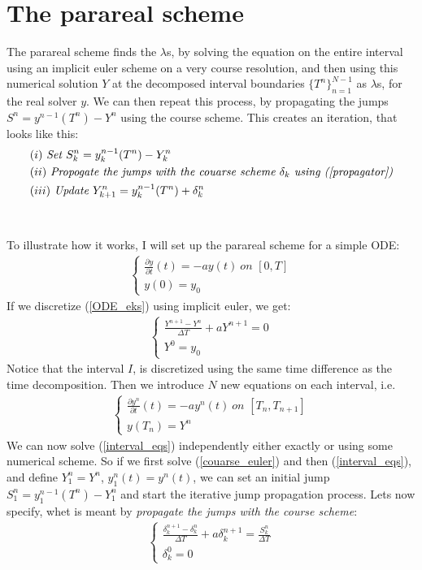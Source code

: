 \documentclass[11pt,a4paper]{article}
\begin{document}
\section{The parareal scheme} 
The parareal scheme finds the $\lambda$s, by solving the equation on the entire interval using an implicit euler scheme on a very course resolution, and then using this numerical solution $Y$ at the decomposed interval boundaries $\{T^n\}_{n=1}^{N-1}$ as $\lambda$s, for the real solver $y$. We can then repeat this process, by propagating the jumps $S^n=y^{n-1}(T^n)-Y^n$ using the course scheme. This creates an iteration, that looks like this:
\begin{align*}
&(i) \ \textit{Set $S^n_k = y_k^{n-1}(T^n)-Y_k^n$} \\
&(ii) \ \textit{Propogate the jumps with the couarse scheme $\delta_k$ using (\ref{propagator})} \\
&(iii) \ \textit{Update $Y_{k+1}^n=y_k^{n-1}(T^n) + \delta_k^n$}
\end{align*} 
\\
\\
To illustrate how it works, I will set up the parareal scheme for a simple ODE:
\begin{align}
\left\{
     \begin{array}{lr}
		\frac{\partial y}{\partial t}(t)=-ay(t) \ 				\textit{on $[0,T]$} \\
		y(0)=y_0
	\end{array}
\right.	\label{ODE_eks}
\end{align}
If we discretize (\ref{ODE_eks}) using implicit euler, we get:
\begin{align}
\left\{
     \begin{array}{lr}
		\frac{Y^{n+1}-Y^{n}}{\Delta T}+aY^{n+1}=0  \\
		Y^0=y_0
	\end{array}
\right.	\label{couarse_euler}
\end{align}
Notice that the interval $I$, is discretized using the same time difference as the time decomposition. Then we introduce $N$ new equations on each interval, i.e.
\begin{align}
\left\{
     \begin{array}{lr}
		\frac{\partial y^n}{\partial t}(t)=-ay^n(t) \ 				\textit{on $[T_n,T_{n+1}]$} \\
		y(T_n)=Y^n
	\end{array}
\right. \label{interval_eqs}
\end{align}
We can now solve (\ref{interval_eqs}) independently either exactly or using some numerical scheme. So if we first solve (\ref{couarse_euler}) and then (\ref{interval_eqs}), and define $Y_1^n=Y^n$, $y_1^n(t)=y^n(t)$, we can set an initial jump $S_1^n=y_1^{n-1}(T^n)-Y_1^n$ and start the iterative jump propagation process. Lets now specify, whet is meant by \textit{propagate the jumps with the course scheme}:
\begin{align}
\left\{
     \begin{array}{lr}
		\frac{\delta_k^{n+1}-\delta_k^{n}}{\Delta T}+a\delta_k^{n+1}=\frac{S_k ^n}{\Delta T}  \\
		\delta_k^0=0
	\end{array}
\right. \label{propagator}
\end{align} 
\end{document}
